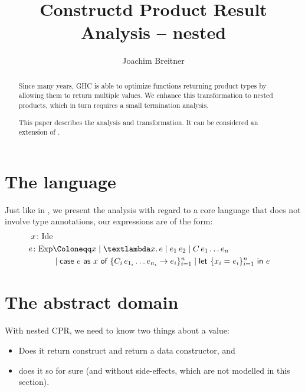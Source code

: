 \documentclass[parskip=half]{scrartcl}
\title{Constructd Product Result Analysis -- nested}
\author{Joachim Breitner}
\newcommand{\sIde}{\text{Ide}}
\newcommand{\sExp}{\text{Exp}}
\newcommand{\sApp}[2]{#1\,#2}
\newcommand{\sLam}[2]{\text{\textlambda} #1.\, #2}
\newcommand{\sCase}[4]{\text{\textsf{case}}\ #1\  \textsf{as}\ #2\ \textsf{of}\ \{#3 \rightarrow #4\}_{i=1}^n}
\newcommand{\sLet}[3]{\text{\textsf{let}}\ \{#1 = #2\}_{i=1}^n\ \text{\textsf{in}}\ #3}
\begin{document}
\maketitle

\begin{abstract}
Since many years, GHC is able to optimize functions returning product types by allowing them to return multiple values. We enhance this transformation to nested products, which in turn requires a small termination analysis.

This paper describes the analysis and transformation. It can be considered an extension of \citep{cpr}.
\end{abstract}

\tableofcontents

\section{The language}

Just like in \citep{cpr}, we present the analysis with regard to a core language that does not involve type annotations, our expressions are of the form:
%
\begin{align*}
x \colon \sIde \\
e \colon \sExp &\Coloneqq x
	\mid \sLam x e
	\mid \sApp {e_1} {e_2}
	\mid \sApp C {e_1\ldots e_n} \\
&	\mid \sCase e x {\sApp {C_i} {e_{1_i}\ldots e_{n_i}}} {e_i}
	\mid \sLet {x_i} {e_i} e
\end{align*}

\section{The abstract domain}

With nested CPR, we need to know two things about a value:
\begin{itemize}
\item Does it return construct and return a data constructor, and
\item does it so for sure (and without side-effects, which are not modelled in this section).
\end{itemize}

\newcommand{\dR}{\textbf{R}}
\newcommand{\dC}{\textbf{C}}
\newcommand{\dD}{\textbf{D}}
\newcommand{\noCPR}{\bullet}
\newcommand{\dunno}[1]{#1?}
\newcommand{\conv}[1]{#1!}
\newcommand{\dLam}[1]{(\sLam\bullet{#1})}
\newcommand{\dApp}[1]{\sApp{#1}\bullet}
\end{document}
